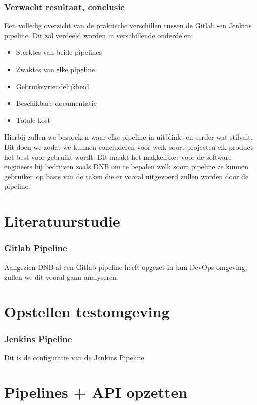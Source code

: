 \section{Verwacht resultaat, conclusie}%
\label{sec:verwachte_resultaten}
Een volledig overzicht van de praktische verschillen tussen de Gitlab -en Jenkins pipeline. Dit zal verdeeld worden in verschillende onderdelen:

\begin{itemize}
    \item Sterktes van beide pipelines
    \item Zwaktes van elke pipeline
    \item Gebruiksvriendelijkheid
    \item Beschikbare documentatie
    \item Totale kost
\end{itemize}

Hierbij zullen we bespreken waar elke pipeline in uitblinkt en eerder wat stilvalt. Dit doen we zodat we kunnen concluderen voor welk soort projecten elk product het best voor gebruikt wordt. Dit maakt het makkelijker voor de software engineers bij bedrijven zoals DNB om te bepalen welk soort pipeline ze kunnen gebruiken op basis van de taken die er vooral uitgevoerd zullen worden door de pipeline. 


\part{Literatuurstudie}
\section{Gitlab Pipeline}
Aangezien DNB al een Gitlab pipeline heeft opgezet in hun DevOps omgeving, zullen we dit vooral gaan analyseren.


\part{Opstellen testomgeving}
\section{Jenkins Pipeline}
Dit is de configuratie van de Jenkins Pipeline


\part{Pipelines + API opzetten}
